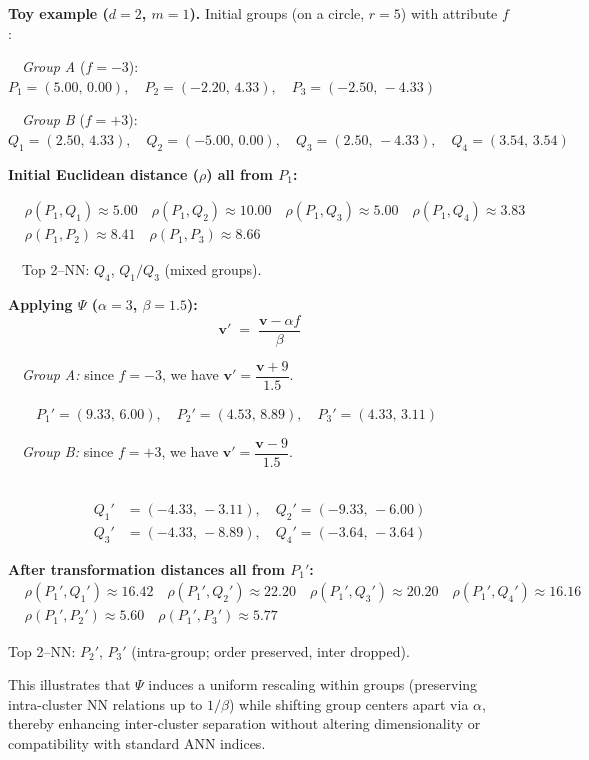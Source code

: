 \documentclass[numbers,sort]{article}
\begin{document}
\medskip
\noindent\textbf{Toy example ($d=2$, $m=1$).}
Initial groups (on a circle, $r=5$) with attribute $f$:

~~\emph{Group A} ($f=-3$): $P_1=(5.00,\, 0.00),\quad P_2=(-2.20,\, 4.33),\quad P_3=(-2.50,\,-4.33)$

~~\emph{Group B} ($f=+3$): $Q_1=(2.50,\, 4.33),\quad Q_2=(-5.00,\, 0.00),\quad Q_3=(2.50,\,-4.33),\quad Q_4=(3.54,\, 3.54)$

\medskip
\noindent\textbf{Initial Euclidean distance ($\rho$) all from $P_1$:}

\[
\begin{aligned}
&\rho(P_1,Q_1) \approx 5.00 \quad
\rho(P_1,Q_2) \approx 10.00 \quad
\rho(P_1,Q_3) \approx 5.00 \quad
\rho(P_1,Q_4) \approx 3.83 \\
&\rho(P_1,P_2) \approx 8.41 \quad
\rho(P_1,P_3) \approx 8.66
\end{aligned}
\]

~~Top 2--NN: $Q_4$, $Q_1/Q_3$ (mixed groups).

\medskip
\noindent\textbf{Applying $\Psi$ ($\alpha=3$, $\beta=1.5$):}
\[
\mathbf{v}' \;=\; \frac{\mathbf{v}-\alpha f}{\beta}
\]

~~\emph{Group A:} since $f=-3$, we have $\mathbf{v}'=\dfrac{\mathbf{v}+9}{1.5}$.

~~~~$P_1'=(9.33,\, 6.00),\quad P_2'=(4.53,\, 8.89),\quad P_3'=(4.33,\, 3.11)$

~~\emph{Group B:} since $f=+3$, we have $\mathbf{v}'=\dfrac{\mathbf{v}-9}{1.5}$.

~~~~\[
\begin{aligned}
Q_1' &= (-4.33,\,-3.11), \quad Q_2' = (-9.33,\,-6.00) \\
Q_3' &= (-4.33,\,-8.89), \quad Q_4' = (-3.64,\,-3.64)
\end{aligned}
\]

\medskip
\noindent\textbf{After transformation distances all from $P_1'$:}
\[
\begin{aligned}
&\rho(P_1',Q_1') \approx 16.42 \quad
\rho(P_1',Q_2') \approx 22.20 \quad
\rho(P_1',Q_3') \approx 20.20 \quad
\rho(P_1',Q_4') \approx 16.16 \\
&\rho(P_1',P_2') \approx 5.60 \quad
\rho(P_1',P_3') \approx 5.77
\end{aligned}
\]

Top 2--NN: $P_2'$, $P_3'$ (intra-group; order preserved, inter dropped).

\medskip
This illustrates that $\Psi$ induces a uniform rescaling within groups (preserving intra-cluster NN relations up to $1/\beta$) while shifting group centers apart via $\alpha$, thereby enhancing inter-cluster separation without altering dimensionality or compatibility with standard ANN indices.
\end{document}
